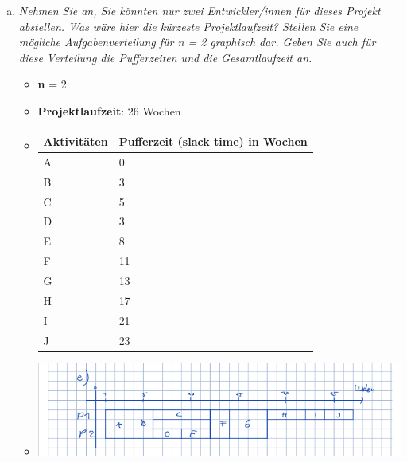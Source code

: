 \begin{enumerate}[(a)]
\newpage
    \item {\itshape Nehmen Sie an, Sie könnten nur zwei Entwickler/innen für dieses Projekt abstellen. Was wäre hier die kürzeste Projektlaufzeit? Stellen Sie eine mögliche Aufgabenverteilung für n = 2 graphisch dar. Geben Sie auch für diese Verteilung die Pufferzeiten und die Gesamtlaufzeit an.}
        \begin{itemize}
            \item \textbf{n} = 2
            \item \textbf{Projektlaufzeit}: 26 Wochen
            \item[] \begin{tabular}{|l|l|}
                \hline
                \textbf{Aktivitäten} &  \textbf{Pufferzeit (slack time)} in Wochen\\ \hline  
                A & 0 \\ \hline 
                B & 3 \\ \hline 
                C & 5 \\ \hline 
                D & 3 \\ \hline 
                E & 8 \\ \hline 
                F & 11 \\ \hline 
                G & 13 \\ \hline 
                H & 17 \\ \hline 
                I & 21 \\ \hline 
                J & 23\\ \hline 
            \end{tabular}
            
            \item[] \includegraphics[width=1\textwidth]{src/u12/task3/e.png} 
        \end{itemize}
    

\end{enumerate}
